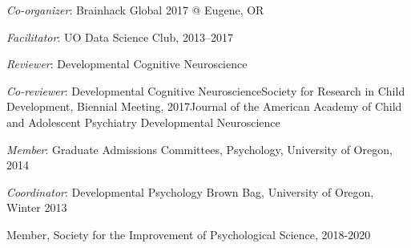 \documentclass[11pt,article,oneside]{memoir}
\begin{document}
\medskip

\ind \textit{Co-organizer}: \newline Brainhack Global 2017 @ Eugene, OR

\ind \textit{Facilitator}: \newline UO Data Science Club, 2013--2017

\ind \textit{Reviewer}:\newline 
Developmental Cognitive Neuroscience

\ind \textit{Co-reviewer}: \newline Developmental Cognitive Neuroscience\newline Society for Research in Child Development, Biennial Meeting, 2017\newline Journal of the American Academy of Child and Adolescent Psychiatry \newline Developmental Neuroscience

\ind \textit{Member}: \newline Graduate Admissions Committees, Psychology, University of Oregon, 2014

\ind \textit{Coordinator}: \newline Developmental Psychology Brown Bag, University of Oregon, Winter 2013

\bigskip
{}
\medskip
\ind Member, Society for the Improvement of Psychological Science, 2018-2020
\end{document}

